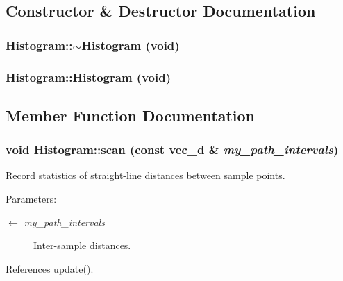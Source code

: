\subsection{Constructor \& Destructor Documentation}
\hypertarget{classHistogram_6be99bbd12f2dfe12c38739166f37db2}{
\subsubsection[$\sim$Histogram]{\setlength{\rightskip}{0pt plus 5cm}Histogram::$\sim$Histogram (void)}}
\label{classHistogram_6be99bbd12f2dfe12c38739166f37db2}


\hypertarget{classHistogram_f7f6bdea94a9e6a44ca389d2a0f2cae2}{
\subsubsection[Histogram]{\setlength{\rightskip}{0pt plus 5cm}Histogram::Histogram (void)}}
\label{classHistogram_f7f6bdea94a9e6a44ca389d2a0f2cae2}




\subsection{Member Function Documentation}
\hypertarget{classHistogram_86dc8ad1a5ecf10e7e2cb3376534637a}{
\subsubsection[scan]{\setlength{\rightskip}{0pt plus 5cm}void Histogram::scan (const {\bf vec\_\-d} \& {\em my\_\-path\_\-intervals})}}
\label{classHistogram_86dc8ad1a5ecf10e7e2cb3376534637a}


Record statistics of straight-line distances between sample points. \begin{Desc}
\item[Parameters:]
\begin{description}
\item[\mbox{$\leftarrow$} {\em my\_\-path\_\-intervals}]Inter-sample distances. \end{description}
\end{Desc}


References update().

